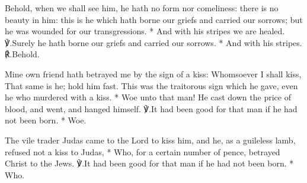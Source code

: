 \documentclass[12pt]{book}
\begin{document}
\begin{enpars}
Behold, when we shall see him, he hath no form nor comeliness: there is no beauty in him: this is he which hath borne our griefs and carried our sorrows; but he was wounded for our transgressions.
* And with his stripes we are healed.
℣.\@ Surely he hath borne our griefs and carried our sorrows.
* And with his stripes. ℟.\@ Behold.
\end{enpars}






\silently


\begin{enpars}
Mine own friend hath betrayed me by the sign of a kiss: Whomsoever I shall kiss, That same is he; hold him fast. This was the traitorous sign which he gave, even he who murdered with a kiss.
* Woe unto that man! He cast down the price of blood, and went, and hanged himself.
℣.\@ It had been good for that man if he had not been born.
* Woe.
\end{enpars}


\begin{enpars}
The vile trader Judas came to the Lord to kiss him, and he, as a guileless lamb, refused not a kiss to Judas,
* Who, for a certain number of pence, betrayed Christ to the Jews.
℣.\@ It had been good for that man if he had not been born.
* Who.
\end{enpars}
\end{document}
